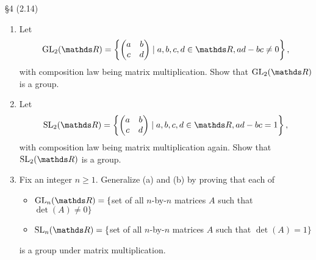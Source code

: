 \documentclass{homework}
\begin{document}
\begin{problem}{\S 4}
  (2.14)
  \begin{enumerate}[label=(\alph*)]
    \item Let \[
        \GL_2(\R) = \left\{\begin{pmatrix} a&b\\c&d \end{pmatrix} \mid a,b,c,d\in \R,ad-bc\neq
        0\right\} 
      ,\]  with composition law being matrix multiplication. Show that $\GL_2(\R)$ is a group.
    \item Let \[
        \SL_2(\R) = \left\{\begin{pmatrix} a&b\\c&d \end{pmatrix} \mid a,b,c,d\in \R,ad-bc=1\right\} 
      ,\]  with composition law being matrix multiplication again. Show that $\SL_2(\R)$ is a group.
    \item Fix an integer $n\ge 1$. Generalize (a) and (b) by proving that each of
      \begin{itemize}
        \item $\GL_n(\R)=\{$set of all $n$-by-$n$ matrices $A$ such that $\det(A)\neq 0\}$ 
        \item $\SL_n(\R)=\{$set of all $n$-by-$n$ matrices $A$ such that $\det(A)=1\}$
      \end{itemize}
      is a group under matrix multiplication.
  \end{enumerate}
\end{problem}
\end{document}
